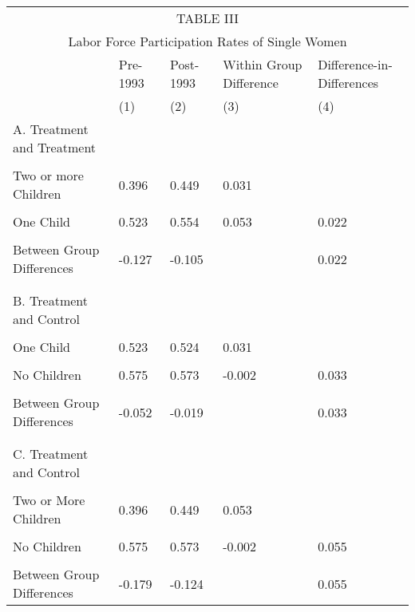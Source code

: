 \begin{tabular}[H]{ |p{4cm}||p{2cm}|p{2cm}|p{2cm}| p{2cm}|}
 \hline
 \multicolumn{5}{|c|}{TABLE III} \\
 \multicolumn{5}{|c|}{Labor Force Participation Rates of Single Women} \\
 \hline
   &Pre-1993&Post-1993 & Within Group Difference & Difference-in-Differences\\
  & (1) & (2) & (3) & (4)\\
 \hline
A.  Treatment and Treatment &&&& \\
&&&&\\
Two or more Children& 0.396 & 0.449 & 0.031 &\\
&&&&\\
One Child& 0.523 & 0.554 & 0.053 & 0.022\\
&&&&\\
Between Group Differences & -0.127&-0.105 &&0.022\\
&&&&\\
&&&&\\
B. Treatment and Control &&&&\\
&&&&\\
One Child & 0.523 & 0.524 &0.031&\\
&&&&\\
No Children & 0.575&0.573&-0.002&0.033\\
&&&&\\
Between Group Differences & -0.052&-0.019&&0.033\\
&&&&\\
&&&&\\
C. Treatment and Control &&&&\\
&&&&\\
Two or More Children & 0.396 & 0.449 & 0.053&\\
&&&&\\
No Children & 0.575&0.573&-0.002&0.055\\
&&&&\\
Between Group Differences& -0.179&-0.124&&0.055\\

\hline
\end{tabular}

